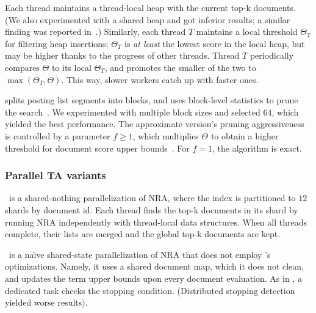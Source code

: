 Each thread maintains a thread-local heap with the current top-k documents. (We also experimented with a shared heap and 
got inferior results; a similar finding was reported in~\cite{rojas2013distributing}.)
Similarly, each thread $T$ maintains a local threshold $\Theta_T$ for filtering heap insertions; 
$\Theta_T$ is \emph{at least} the lowest score in the local heap, but may be higher thanks to the progress of other threads.  
Thread $T$ periodically compares $\Theta$ to its local $\Theta_T$, and promotes the smaller of the two to $\max(\Theta_T, \Theta)$. 
This way,  slower workers catch up with  faster ones.

\pBMW
splits posting list segments into blocks, and uses block-level
statistics to prune the search~\cite{Ding:2011}. We experimented with multiple block sizes and selected $64$, 
which yielded the best performance.
The approximate version's pruning aggressiveness is  controlled by  a parameter 
$f \geq 1$, which multiplies $\Theta$ to obtain a higher threshold for document score upper bounds~\cite{Broder:2003}. For $f=1$, the algorithm is exact.


\subsubsection{Parallel TA variants}

\sNRA\ is a shared-nothing parallelization of NRA, where the index is partitioned to $12$ shards by document id. 
Each thread finds the top-k documents in its shard by running NRA independently with thread-local data structures. 
When all threads complete, their lists are merged and the global top-k documents are kept.  

\pNRA\ is a na\"{\i}ve shared-state parallelization of NRA that does not employ \alg's optimizations. 
Namely, it uses a shared document map, which it does not clean, and updates the term
upper bounds upon every document evaluation. As in \alg, a dedicated task checks the stopping condition.
(Distributed stopping detection yielded worse results).


